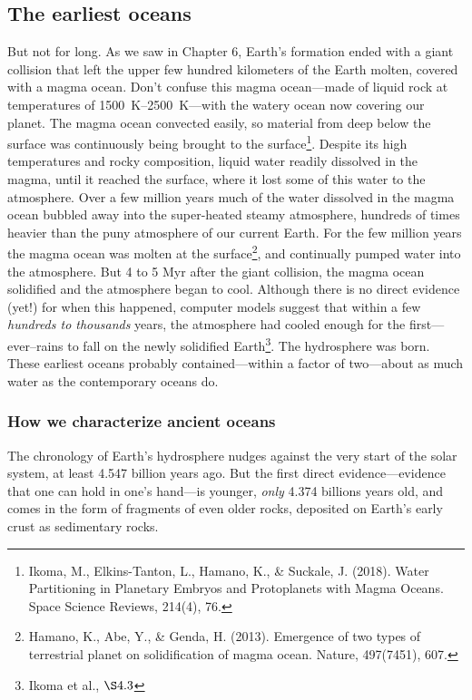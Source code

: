 {\subsection{The earliest oceans}
But not for long. As we saw in Chapter 6, Earth's formation ended with a giant collision that left the upper few hundred kilometers of the Earth molten, covered with a magma ocean. Don't confuse this magma ocean---made of liquid rock at temperatures of \SIrange{1500}{2500}{\kelvin}---with the watery ocean now covering our planet. The magma ocean convected easily, so material from deep below the surface was continuously being brought to the surface\footnote{Ikoma, M., Elkins-Tanton, L., Hamano, K., \& Suckale, J. (2018). Water Partitioning in Planetary Embryos and Protoplanets with Magma Oceans. Space Science Reviews, 214(4), 76.}. Despite its high temperatures and rocky composition, liquid water readily dissolved in the magma, until it reached the surface, where it lost some of this water to the atmosphere. Over a few million years much of the water dissolved in the magma ocean bubbled away into the super-heated steamy atmosphere, hundreds of times heavier than the puny atmosphere of our current Earth. For the few million years the magma ocean was molten at the surface\footnote{Hamano, K., Abe, Y., \& Genda, H. (2013). Emergence of two types of terrestrial planet on solidification of magma ocean. Nature, 497(7451), 607.}, and continually pumped water into the atmosphere. But 4 to 5 Myr after the giant collision, the magma ocean solidified and the atmosphere began to cool. Although there is no direct evidence (yet!) for when this happened, computer models suggest that within a few \emph{hundreds to thousands} years, the atmosphere had cooled enough for the first---ever--rains to fall on the newly solidified Earth\footnote{Ikoma et al., $\S 4.3$}. The hydrosphere was born. These earliest oceans probably contained---within a factor of two---about as much water as the contemporary oceans do.
\subsubsection{How we characterize ancient oceans}
The chronology of Earth's hydrosphere nudges against the very start of the solar system, at least 4.547 billion years ago. But the first direct evidence---evidence that one can hold in one's hand---is younger, \emph{only} 4.374 billions years old, and comes in the form of fragments of even older rocks, deposited on Earth's early crust as sedimentary rocks.
}
